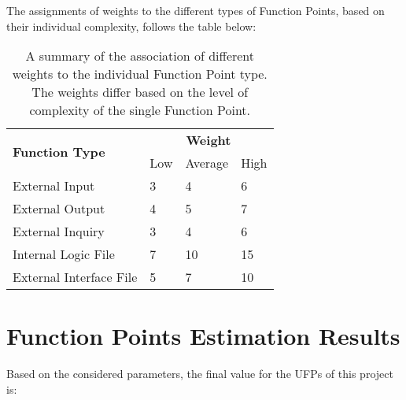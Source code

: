 The assignments of weights to the different types of Function Points, based on their individual complexity, follows the table below:

\begin{table}[H]
    \centering
    \begin{tabular}{ l | l | l | l }
        \hline
        \multirow{2}{*}{\textbf{Function Type}} & \multicolumn{3}{c}{\textbf{Weight}} \\
        \cline{2-4}
        & Low & Average & High \\
        \hline
        \hline
        External Input          & 3     & 4     & 6     \\
        \hline
        External Output         & 4     & 5     & 7     \\
        \hline
        External Inquiry        & 3     & 4     & 6     \\
        \hline
        Internal Logic File     & 7     & 10    & 15    \\
        \hline
        External Interface File & 5     & 7     & 10    \\
        \hline
    \end{tabular}
    \caption{A summary of the association of different weights to the individual Function Point type. The weights differ based on the level of complexity of the single Function Point.}
    \label{fps_weights}
\end{table}


\section{Function Points Estimation Results}
Based on the considered parameters, the final value for the UFPs of this project is: %


